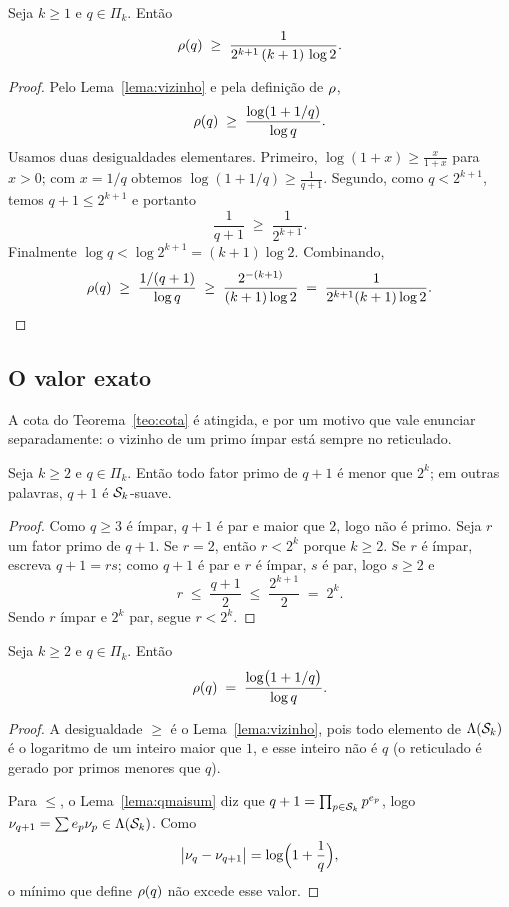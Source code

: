 \begin{teorema}\label{teo:cota}
Seja $k\ge1$ e $q\in\Pi_k$. Então
\[
  \rho(q) \;\ge\; \frac{1}{2^{k+1}\,(k+1)\,\log 2}.
\]
\end{teorema}

\begin{proof}
Pelo Lema~\ref{lema:vizinho} e pela definição de $\rho$,
\[
  \rho(q) \;\ge\; \frac{\log(1+1/q)}{\log q}.
\]
Usamos duas desigualdades elementares. Primeiro, $\log(1+x)\ge \frac{x}{1+x}$ para
$x>0$; com $x=1/q$ obtemos $\log(1+1/q)\ge \frac{1}{q+1}$. Segundo, como
$q<2^{k+1}$, temos $q+1\le 2^{k+1}$ e portanto
\[
  \frac{1}{q+1}\;\ge\;\frac{1}{2^{k+1}} .
\]
Finalmente $\log q<\log 2^{k+1}=(k+1)\log 2$. Combinando,
\[
  \rho(q)\;\ge\;\frac{1/(q+1)}{\log q}\;\ge\;
  \frac{2^{-(k+1)}}{(k+1)\log 2}
  \;=\;\frac{1}{2^{k+1}(k+1)\log 2}. \qedhere
\]
\end{proof}

\subsection{O valor exato}

A cota do Teorema~\ref{teo:cota} é atingida, e por um motivo que vale enunciar
separadamente: o vizinho de um primo ímpar está sempre no reticulado.

\begin{lema}\label{lema:qmaisum}
Seja $k\ge2$ e $q\in\Pi_k$. Então todo fator primo de $q+1$ é menor que $2^k$; em
outras palavras, $q+1$ é $\mathcal{S}_k$-suave.
\end{lema}

\begin{proof}
Como $q\ge3$ é ímpar, $q+1$ é par e maior que $2$, logo não é primo. Seja $r$ um
fator primo de $q+1$. Se $r=2$, então $r<2^k$ porque $k\ge2$. Se $r$ é ímpar,
escreva $q+1=rs$; como $q+1$ é par e $r$ é ímpar, $s$ é par, logo $s\ge2$ e
\[
  r\;\le\;\frac{q+1}{2}\;\le\;\frac{2^{k+1}}{2}\;=\;2^k .
\]
Sendo $r$ ímpar e $2^k$ par, segue $r<2^k$.
\end{proof}

\begin{teorema}\label{teo:exato}
Seja $k\ge2$ e $q\in\Pi_k$. Então
\[
  \rho(q) \;=\; \frac{\log\bigl(1+1/q\bigr)}{\log q} .
\]
\end{teorema}

\begin{proof}
A desigualdade $\ge$ é o Lema~\ref{lema:vizinho}, pois todo elemento de
$\Lambda(\mathcal{S}_k)$ é o logaritmo de um inteiro maior que $1$, e esse inteiro não é
$q$ (o reticulado é gerado por primos menores que $q$).

Para $\le$, o Lema~\ref{lema:qmaisum} diz que $q+1=\prod_{p\in\mathcal{S}_k}p^{e_p}$,
logo $\nu_{q+1}=\sum e_p\nu_{p}\in\Lambda(\mathcal{S}_k)$. Como
\[
  \bigl|\nu_{q}-\nu_{q+1}\bigr| = \log\Bigl(1+\frac1q\Bigr),
\]
o mínimo que define $\rho(q)$ não excede esse valor.
\end{proof}

